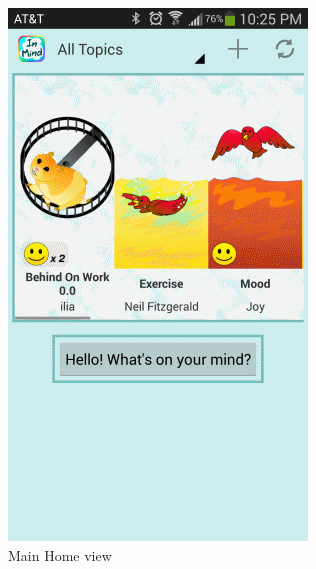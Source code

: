\begin{figure}
\begin{subfigure}[b]{0.3\textwidth}
        \includegraphics[width=\textwidth]{home_view.png}
         \caption{Main Home view}
      \end{subfigure}
      \begin{subfigure}[b]{0.3\textwidth}

\end{subfigure}
\end{figure}
